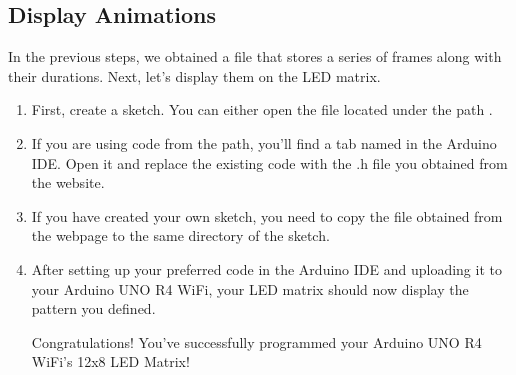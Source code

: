 \documentclass[a4paper,11pt,english]{sphinxmanual}
\begin{document}
\subsection{Display Animations}
\label{\detokenize{Extension_Project/12x8_LED_Matrix:display-animations}}
\sphinxAtStartPar
In the previous steps, we obtained a  file that stores a series of frames along with their durations. Next, let’s display them on the LED matrix.
\begin{enumerate}
%
\item {} 
\sphinxAtStartPar
First, create a sketch. You can either open the  file located under the path .

\item {} 
\sphinxAtStartPar
If you are using code from the  path, you’ll find a tab named  in the Arduino IDE. Open it and replace the existing code with the .h file you obtained from the website.

\noindent{}

\item {} 
\sphinxAtStartPar
If you have created your own sketch, you need to copy the  file obtained from the webpage to the same directory of the sketch.

\item {} 
\sphinxAtStartPar
After setting up your preferred code in the Arduino IDE and uploading it to your Arduino UNO R4 WiFi, your LED matrix should now display the pattern you defined.

\sphinxAtStartPar
Congratulations! You’ve successfully programmed your Arduino UNO R4 WiFi’s 12x8 LED Matrix!

\end{enumerate}

\sphinxAtStartPar
{}

\sphinxAtStartPar
{}
\end{document}
